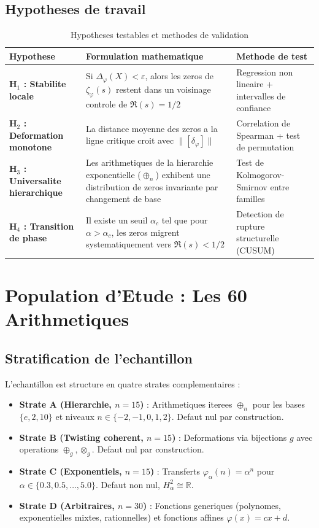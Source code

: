 \documentclass[11pt,a4paper]{article}
\begin{document}
	\subsection{Hypotheses de travail}
	\begin{table}[ht]
		\centering
		\caption{Hypotheses testables et methodes de validation}
		\label{tab:hypotheses}
		\begin{tabularx}{\textwidth}{lXl}
			\toprule
			\textbf{Hypothese} & \textbf{Formulation mathematique} & \textbf{Methode de test} \\
			\midrule
			\textbf{H$_1$ : Stabilite locale} & Si $\Delta_\varphi(X) < \varepsilon$, alors les zeros de $\zeta_\varphi(s)$ restent dans un voisinage controle de $\Re(s)=1/2$ & Regression non lineaire + intervalles de confiance \\
			\textbf{H$_2$ : Deformation monotone} & La distance moyenne des zeros a la ligne critique croit avec $\|[\delta_\varphi]\|$ & Correlation de Spearman + test de permutation \\
			\textbf{H$_3$ : Universalite hierarchique} & Les arithmetiques de la hierarchie exponentielle ($\oplus_n$) exhibent une distribution de zeros invariante par changement de base & Test de Kolmogorov-Smirnov entre familles \\
			\textbf{H$_4$ : Transition de phase} & Il existe un seuil $\alpha_c$ tel que pour $\alpha > \alpha_c$, les zeros migrent systematiquement vers $\Re(s) < 1/2$ & Detection de rupture structurelle (CUSUM) \\
			\bottomrule
		\end{tabularx}
	\end{table}
	
	\section{Population d'Etude : Les 60 Arithmetiques}
	\label{sec:population}
	
	\subsection{Stratification de l'echantillon}
	L'echantillon est structure en quatre strates complementaires :
	\begin{itemize}
		\item \textbf{Strate A (Hierarchie, $n=15$)} : Arithmetiques iterees $\oplus_n$ pour les bases $\{e, 2, 10\}$ et niveaux $n \in \{-2,-1,0,1,2\}$. Defaut nul par construction.
		\item \textbf{Strate B (Twisting coherent, $n=15$)} : Deformations via bijections $g$ avec operations $\oplus_g, \otimes_g$. Defaut nul par construction.
		\item \textbf{Strate C (Exponentiels, $n=15$)} : Transferts $\varphi_\alpha(n)=\alpha^n$ pour $\alpha \in \{0.3, 0.5, \dots, 5.0\}$. Defaut non nul, $H^2_\alpha \cong \mathbb{R}$.
		\item \textbf{Strate D (Arbitraires, $n=30$)} : Fonctions generiques (polynomes, exponentielles mixtes, rationnelles) et fonctions affines $\varphi(x)=cx+d$.
	\end{itemize}
	
\end{document}

